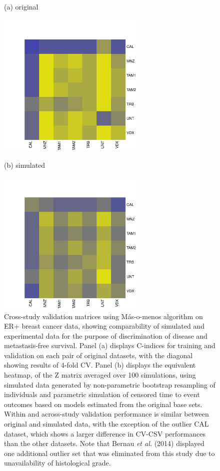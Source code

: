 \documentclass{article}
\begin{document}
\begin{figure}[H]
    \centering
    \begin{minipage}[b]{0.5\linewidth}
    \centerline{(a) original}
    \includegraphics[width=7cm]{heatmap-a.pdf}
    \end{minipage}%
    \begin{minipage}[b]{0.5\linewidth}
    \centerline{(b) simulated}
    \includegraphics[width=7cm]{heatmap-b.pdf}
    \end{minipage}
    \caption{Cross-study validation matrices using
      M\'{a}s-o-menos algorithm on ER+ breast cancer data, showing
        comparability of simulated and experimental data for the
        purpose of discrimination of disease and metastasis-free survival. Panel (a)
      displays C-indices for training and validation on each pair of
      original datasets, with the diagonal showing results of
      4-fold CV. Panel (b) displays the equivalent heatmap, of the Z matrix
      averaged over 100 simulations, using
      simulated data generated by non-parametric bootstrap resampling
      of individuals and parametric simulation of censored time to event
      outcomes based on models estimated from the original base sets.
      Within and across-study validation performance
      is similar between original and simulated data, with the
      exception of the outlier CAL
      dataset, which shows a larger difference in CV-CSV performances than the other datasets. Note that
      Bernau \textit{et al.} (2014) displayed one additional outlier set that was
      eliminated from this study due to unavailability
      of histological grade.}
    \label{heatmaps}
  \end{figure}
  
\end{document}
